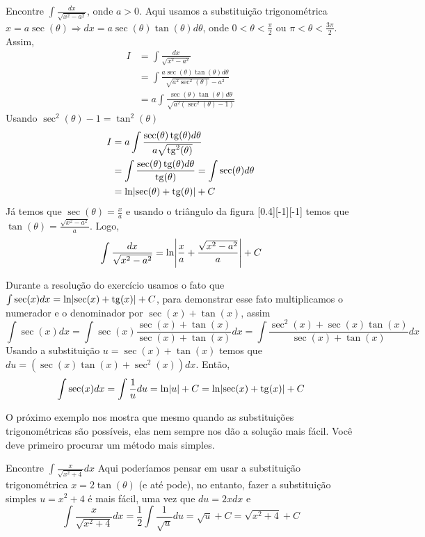 \begin{example}
  Encontre \(\int \frac{dx}{\sqrt{x^2-a^2}}\), onde $a>0$.
  \solution
  Aqui usamos a substituição trigonométrica
  $x=a\sec(\theta ) \Rightarrow dx= a \sec(\theta) \tan(\theta) d \theta$,
  onde $0 < \theta < \frac{\pi}{2}$ ou $\pi < \theta  < \frac{3\pi}{2}$.
  Assim,
  \begin{align*}
    I
    & = \int \frac{dx}{\sqrt{x^2-a^2}} \\
    & = \int  \frac{ a \sec(\theta) \tan(\theta) d \theta}{\sqrt{a^2 \sec^2(\theta)}-a^2} \\
    & = a\int \frac{ \sec(\theta) \tan(\theta) d \theta}{\sqrt{a^2(\sec^2(\theta)-1)}}
  \end{align*}
  Usando \(\sec^2(\theta)-1= \tan^2(\theta)\)
  \begin{align*}
    I
    & = a \int \frac{\sec(\theta) \tan(\theta) d \theta}{a \sqrt{\tan^2(\theta)}} \\
    & = \int \frac{\sec(\theta)\tan(\theta) d \theta}{\tan(\theta)}= \int \sec(\theta) d \theta \\
    & = \ln \abs{\sec(\theta)+ \tan(\theta)} + C
  \end{align*}
  Já temos que $\sec(\theta)= \frac{x}{a}$ e usando o triângulo da figura
  [0.4][-1][-1]
  temos que $\tan(\theta)=\frac{\sqrt{x^2-a^2}}{a}$.
  Logo,
  \[
    \int \frac{dx}{\sqrt{x^2-a^2}}
    = \ln \abs{\frac{x}{a}+ \frac{\sqrt{x^2-a^2}}{a}}+ C
  \]
\end{example}

Durante a resolução do exercício usamos o fato que
$\int \sec(x) dx = \ln \abs{\sec(x)+\tan(x)}+ C$,
para demonstrar esse fato multiplicamos o numerador e o denominador
por $\sec(x)+\tan(x)$, assim
\[
  \int \sec(x) dx
  = \int \sec(x) \frac{\sec(x)+\tan(x)}{\sec(x)+\tan(x)}dx
  = \int \frac{\sec^2(x)+ \sec(x)\tan(x)}{\sec(x)+\tan(x)} dx
\]
Usando a substituição $u=\sec(x)+\tan(x)$
temos que $du= (\sec(x)\tan(x)+ \sec^2(x))dx$.
Então,
\[
  \int \sec(x) dx
  = \int \frac{1}{u} du
  = \ln\abs{u}+C
  = \ln \abs{\sec(x)+\tan(x)}+ C
\]

O próximo exemplo nos mostra que mesmo quando as substituições
trigonométricas são possíveis, elas nem sempre nos dão a solução mais fácil.
Você deve primeiro procurar um método mais simples.

\begin{example}
  Encontre \(\int \frac{x}{\sqrt{x^2+4}} dx\)
  \solution
  Aqui poderíamos pensar em usar a substituição trigonométrica
  $x=2 \tan(\theta)$ (e até pode), no entanto, fazer a substituição
  simples $u=x^2+4$ é mais fácil, uma vez que $du=2x dx$ e
  \[
    \int \frac{x}{\sqrt{x^2+4}} dx
    = \frac{1}{2} \int \frac{1}{\sqrt{u}} du
    = \sqrt{u}+ C
    = \sqrt{x^2+4}+C
  \]
\end{example}

